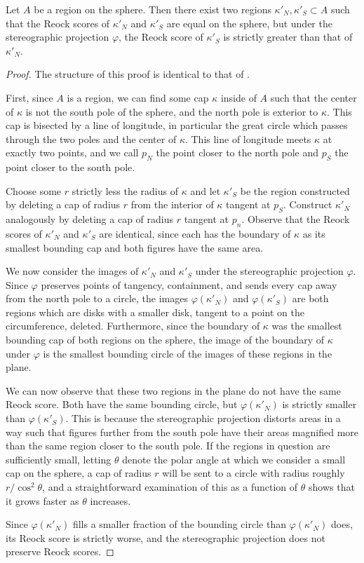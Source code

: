 \begin{theorem}\label{thm:reock}
	Let $A$ be a region on the sphere.  Then there exist two regions $\kappa'_N,\kappa'_S\subset A$ such that the Reock scores of $\kappa'_N$ and $\kappa'_S$ are equal on the sphere, but under the stereographic projection $\varphi$, the Reock score of $\kappa'_S$ is strictly greater than that of $\kappa'_N$. 
\end{theorem}


\begin{proof}
	
	The structure of this proof is identical to that of .
	
	First, since $A$ is a region, we can find some cap $\kappa$ inside of $A$ such that the center of $\kappa$ is not the south pole of the sphere, and the north pole is exterior to $\kappa$.  This cap is bisected by a line of longitude, in particular the great circle which passes through the two poles and the center of $\kappa$.  This line of longitude meets $\kappa$ at exactly two points, and we call $p_N$ the point closer to the north pole and $p_S$ the point closer to the south pole.
	
	Choose some $r$ strictly less the radius of $\kappa$ and let $\kappa'_S$ be the region constructed by deleting a cap of radius $r$ from the interior of $\kappa$ tangent at $p_S$.  Construct $\kappa'_N$ analogously by deleting a cap of radius $r$ tangent at $p_n$. Observe that the Reock scores of $\kappa'_N$ and $\kappa'_S$ are identical, since each has the boundary of $\kappa$ as its smallest bounding cap and both figures have the same area.
	
	We now consider the images of $\kappa'_N$ and $\kappa'_S$ under the stereographic projection $\varphi$.  Since $\varphi$ preserves points of tangency, containment, and sends every cap away from the north pole to a circle, the images $\varphi(\kappa'_N)$ and $\varphi(\kappa'_S)$ are both regions which are disks with a smaller disk, tangent to a point on the circumference, deleted.  Furthermore, since the boundary of $\kappa$ was the smallest bounding cap of both regions on the sphere, the image of the boundary of $\kappa$ under $\varphi$ is the smallest bounding circle of the images of these regions in the plane.
	
	We can now observe that these two regions in the plane do not have the same Reock score.  Both have the same bounding circle, but $\varphi(\kappa'_N)$ is strictly smaller than $\varphi(\kappa'_S)$.  This is because the stereographic projection distorts areas in a way such that figures further from the south pole have their areas magnified more than the same region closer to the south pole.  If the regions in question are sufficiently small, letting $\theta$ denote the polar angle at which we consider a small cap on the sphere, a cap of radius $r$ will be sent to a circle with radius roughly $r/\cos^2{\theta}$, and a straightforward examination of this as a function of $\theta$ shows that it grows faster as $\theta$ increases.
	
	Since $\varphi(\kappa'_N)$ fills a smaller fraction of the bounding circle than $\varphi(\kappa'_N)$ does, its Reock score is strictly worse, and the stereographic projection does not preserve Reock scores.
\end{proof}
